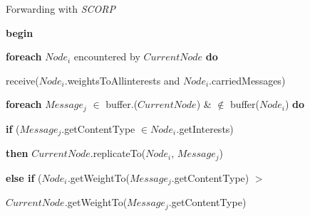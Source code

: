 \documentclass[lnicst]{svmultln}
\begin{document}
\begin{algorithm}
\caption{\label{alg:AlgorithmSCORP}Forwarding with \emph{SCORP}}


\textbf{\footnotesize begin}{\footnotesize \par}

{\footnotesize \hspace{0.1 cm}}\textbf{\footnotesize foreach}\emph{\footnotesize{}
$Node_{i}$ }{\footnotesize encountered by $CurrentNode$ }\textbf{\footnotesize do}{\footnotesize \par}

{\footnotesize \hspace{0.3 cm}receive(}\emph{\footnotesize $Node_{i}$}{\footnotesize .weightsToAllinterests
and }\emph{\footnotesize $Node_{i}$}{\footnotesize .carriedMessages)}\textbf{\footnotesize \vspace{-0.01 cm}}{\footnotesize \par}

{\footnotesize \hspace{0.3 cm}}\textbf{\footnotesize foreach}{\footnotesize{}
$Message_{j}$}\textbf{\footnotesize{} }{\footnotesize $\in$}\textbf{\footnotesize{}
}{\footnotesize buffer.($CurrentNode$) \& $\notin$ buffer(}\emph{\footnotesize $Node_{i}$}{\footnotesize )
}\textbf{\footnotesize do\vspace{-0.03 cm}}{\footnotesize \par}

{\footnotesize \hspace{0.6 cm}}\textbf{\footnotesize if}{\footnotesize{}
($Message_{j}$.getContentType $\in$}\emph{\footnotesize $Node_{i}$.}{\footnotesize getInterests)}\textbf{\footnotesize \vspace{-0.03 cm}}{\footnotesize \par}

{\footnotesize \hspace{0.9 cm}}\textbf{\footnotesize then}{\footnotesize{}
$CurrentNode$.replicateTo(}\emph{\footnotesize $Node_{i}$}{\footnotesize ,
$Message_{j}$)}\textbf{\footnotesize \vspace{-0.03 cm}}{\footnotesize \par}

{\footnotesize \hspace{0.6 cm}}\textbf{\footnotesize else if}{\footnotesize{}
(}\emph{\footnotesize $Node_{i}$.}{\footnotesize getWeightTo($Message_{j}$.getContentType)
$>$ }{\footnotesize \par}

{\footnotesize \hspace{2.5 cm}$CurrentNode$}\emph{\footnotesize .}{\footnotesize getWeightTo($Message_{j}$.getContentType)}\textbf{\footnotesize \vspace{-0.03 cm}}{\footnotesize \par}


\end{algorithm}
\end{document}
